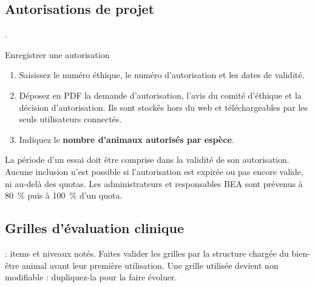 \documentclass[11pt,a4paper]{article}
\begin{document}
\subsection{Autorisations de projet}
.
\begin{procedure}{Enregistrer une autorisation}
\begin{enumerate}
  \item Saisissez le numéro éthique, le numéro d'autorisation et les dates
    de validité.
  \item Déposez en PDF la demande d'autorisation, l'avis du comité
    d'éthique et la décision d'autorisation. Ils sont stockés hors du web et
    téléchargeables par les seuls utilisateurs connectés.
  \item Indiquez le \textbf{nombre d'animaux autorisés par espèce}.
\end{enumerate}
\end{procedure}
\begin{regle}
La période d'un essai doit être comprise dans la validité de son
autorisation. Aucune inclusion n'est possible si l'autorisation est expirée
ou pas encore valide, ni au-delà des quotas. Les administrateurs et
responsables BEA sont prévenus à 80~\% puis à 100~\% d'un quota.
\end{regle}

\subsection{Grilles d'évaluation clinique}
 : items et niveaux notés.
Faites valider les grilles par la structure chargée du bien-être animal avant
leur première utilisation. Une grille utilisée devient non modifiable :
dupliquez-la pour la faire évoluer.
\end{document}

